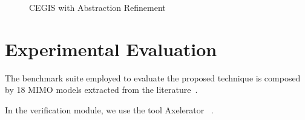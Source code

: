 \documentclass[sigconf]{llncs}
\newcommand{\jrronly}[1]{{}}
\begin{document}
\begin{figure*}[htb]
{\begin{tikzpicture}[scale=0.3,->,>=stealth',shorten >=.2pt,auto, semithick, initial text=, ampersand replacement=\&,]

 \end{tikzpicture}
}
\caption{CEGIS with Abstraction Refinement}
\label{fig:CEGARIS}
\end{figure*}

\section{Experimental Evaluation}
\label{exp:evaluation}

\jrronly{
\subsection{Description of the benchmarks}
\label{exp:benchmarks}
}

The benchmark suite employed to evaluate the proposed technique is 
composed by 18 MIMO models extracted from the literature~\cite{acrobot,cstr,CHEN1979389,KOKOTOVIC198023,gajic2008optimal,Franklin15,maglev,converters}.

In the verification module, we use the tool Axelerator~\cite{} .
\end{document}

